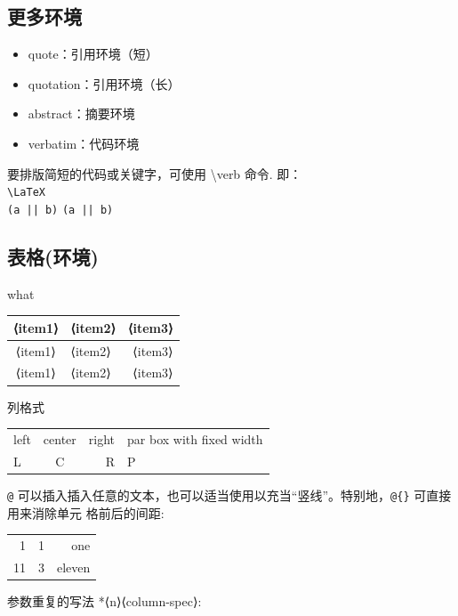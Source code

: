 \documentclass[10pt,a4paper,twocolumn]{book}
\begin{document}
\raggedright

\subsection{更多环境}
\begin{itemize}
    \item quote：引用环境（短）
    \item quotation：引用环境（长）
    \item abstract：摘要环境
    \item verbatim：代码环境
\end{itemize}
要排版简短的代码或关键字，可使用 \textbackslash verb 命令.
即：\\%
\verb|\LaTeX| \\ 
\verb+(a || b)+ \verb*+(a || b)+

\subsection{表格(环境)}
what\\
\begin{tabular}[t]{c||l r} 
    \hline \hline 
    ⟨item1⟩ & ⟨item2⟩ & ⟨item3⟩ \\
    \hline 
    ⟨item1⟩ & ⟨item2⟩ & ⟨item3⟩ \\
    \hline 
    ⟨item1⟩ & ⟨item2⟩ & ⟨item3⟩ \\
    \hline \hline 
 \end{tabular}

 列格式 \\
 
 \begin{tabular}[t]{lcr|p{6em}}%
    \hline
    left & center & right
        & par box with fixed width\\
    L & C & R & P \\
    \hline
    \end{tabular}

\verb|@| 可以插入插入任意的文本，也可以适当使用以充当“竖线”。特别地，\verb|@{}| 可直接用来消除单元
格前后的间距:

\centering
\begin{tabular}[t]{@{} r@{:}lr @{|}}
    \hline 1 & 1 & one \\
     11 & 3 & eleven \\
    \hline
\end{tabular}

\raggedright
参数重复的写法 *{⟨n⟩}{⟨column-spec⟩}:
\end{document}
